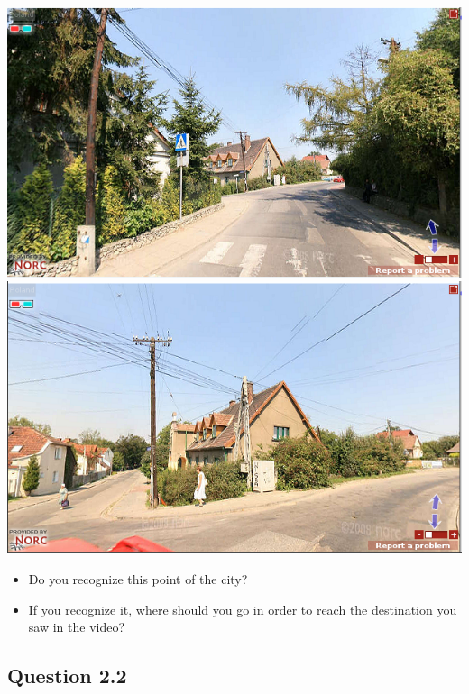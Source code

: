 \documentclass[12pt,a4paper,openright, notitlepage]{report}
\begin{document}
\includegraphics[width=\textwidth]{imgs/image-question21-1}
\includegraphics[width=\textwidth]{imgs/image-question21-2}

\begin{itemize}
	\item Do you recognize this point of the city?
	\item If you recognize it, where should you go in order to reach the destination you saw in the video?
\end{itemize}

\newpage

\subsection{Question 2.2}
\end{document}
